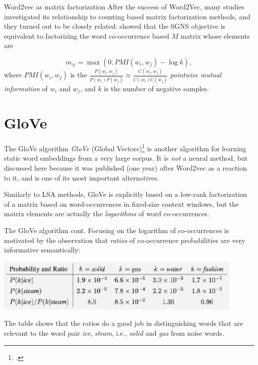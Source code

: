 \documentclass[style=upen, size=14pt]{powerdot}
\newcommand{\gold}{\color{arany}}
\theoremstyle{definition}
\begin{document}
\begin{slide}[toc=W2V as factorization]{Word2vec as matrix factorization}
  After the success of Word2Vec, many studies investigated its relationship to
  counting based matrix factorization methods, and they turned out to be closely
  related: \cite{levy2014neural} showed that the SGNS objective is equivalent to
  factorizing the word co-occurrence based $M$ matrix whose elements are

  $$
  m_{ij} = \max(0, PMI(w_i, w_j )- \log k),
  $$
  where $PMI(w_i,w_j)$ is the
  $\frac{P(w_i, w_j)}{P(w_i)P(w_j)}\approx \frac{C(w_i, w_j)}{C(w_i)C(w_j)}$
  \emph{pointwise mutual information} of $w_i$ and $w_j$, and $k$ is the number
  of negative samples.
\end{slide}

\section{GloVe}


\begin{slide}[toc=Algorithm]{The GloVe algorithm}
  \emph{\gold GloVe} (Global Vectors)\footnote{\cite{pennington2014glove}.} is
  another algorithm for learning static word embeddings from a very large
  corpus. It is \emph{not} a neural method, but discussed here because it was
  published (one year) after Word2vec as a reaction to it, and is one of its
  most important alternatives.\bigskip

  Similarly to LSA methods, GloVe is explicitly based on a low-rank
  factorization of a matrix based on word-occurrences in fixed-size context
  windows, but the matrix elements are actually the \emph{logarithms} of word
  co-occurrences.
\end{slide}

\begin{slide}[toc=]{The GloVe algorithm cont.} 
  Focusing on the logarithm of co-occurrences is motivated by the observation
  that \emph{ratios} of co-occurrence probabilities are very informative
  semantically:
  \begin{center}
    \includegraphics[width=0.9\textwidth]{figures/glove.eps}
  \end{center}
  The table shows that the ratios do a good job in distinguishing words that are
  relevant to the word pair \emph{ice}, \emph{steam}, i.e., \emph{solid} and
  \emph{gas} from noise words.
\end{slide}
\end{document}
